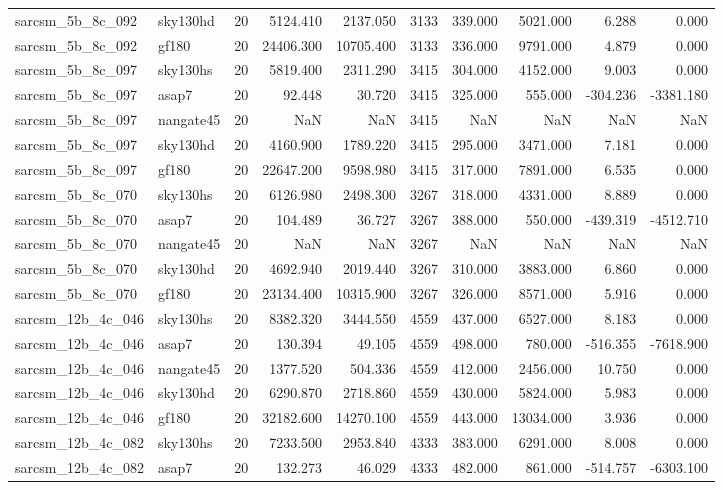 \begin{tabular}{llrrrrrrrr}
sarcsm\_5b\_8c\_092 & sky130hd & 20 & 5124.410 & 2137.050 & 3133 & 339.000 & 5021.000 & 6.288 & 0.000 \\
sarcsm\_5b\_8c\_092 & gf180 & 20 & 24406.300 & 10705.400 & 3133 & 336.000 & 9791.000 & 4.879 & 0.000 \\
sarcsm\_5b\_8c\_097 & sky130hs & 20 & 5819.400 & 2311.290 & 3415 & 304.000 & 4152.000 & 9.003 & 0.000 \\
sarcsm\_5b\_8c\_097 & asap7 & 20 & 92.448 & 30.720 & 3415 & 325.000 & 555.000 & -304.236 & -3381.180 \\
sarcsm\_5b\_8c\_097 & nangate45 & 20 & NaN & NaN & 3415 & NaN & NaN & NaN & NaN \\
sarcsm\_5b\_8c\_097 & sky130hd & 20 & 4160.900 & 1789.220 & 3415 & 295.000 & 3471.000 & 7.181 & 0.000 \\
sarcsm\_5b\_8c\_097 & gf180 & 20 & 22647.200 & 9598.980 & 3415 & 317.000 & 7891.000 & 6.535 & 0.000 \\
sarcsm\_5b\_8c\_070 & sky130hs & 20 & 6126.980 & 2498.300 & 3267 & 318.000 & 4331.000 & 8.889 & 0.000 \\
sarcsm\_5b\_8c\_070 & asap7 & 20 & 104.489 & 36.727 & 3267 & 388.000 & 550.000 & -439.319 & -4512.710 \\
sarcsm\_5b\_8c\_070 & nangate45 & 20 & NaN & NaN & 3267 & NaN & NaN & NaN & NaN \\
sarcsm\_5b\_8c\_070 & sky130hd & 20 & 4692.940 & 2019.440 & 3267 & 310.000 & 3883.000 & 6.860 & 0.000 \\
sarcsm\_5b\_8c\_070 & gf180 & 20 & 23134.400 & 10315.900 & 3267 & 326.000 & 8571.000 & 5.916 & 0.000 \\
sarcsm\_12b\_4c\_046 & sky130hs & 20 & 8382.320 & 3444.550 & 4559 & 437.000 & 6527.000 & 8.183 & 0.000 \\
sarcsm\_12b\_4c\_046 & asap7 & 20 & 130.394 & 49.105 & 4559 & 498.000 & 780.000 & -516.355 & -7618.900 \\
sarcsm\_12b\_4c\_046 & nangate45 & 20 & 1377.520 & 504.336 & 4559 & 412.000 & 2456.000 & 10.750 & 0.000 \\
sarcsm\_12b\_4c\_046 & sky130hd & 20 & 6290.870 & 2718.860 & 4559 & 430.000 & 5824.000 & 5.983 & 0.000 \\
sarcsm\_12b\_4c\_046 & gf180 & 20 & 32182.600 & 14270.100 & 4559 & 443.000 & 13034.000 & 3.936 & 0.000 \\
sarcsm\_12b\_4c\_082 & sky130hs & 20 & 7233.500 & 2953.840 & 4333 & 383.000 & 6291.000 & 8.008 & 0.000 \\
sarcsm\_12b\_4c\_082 & asap7 & 20 & 132.273 & 46.029 & 4333 & 482.000 & 861.000 & -514.757 & -6303.100 \\

\end{tabular}
